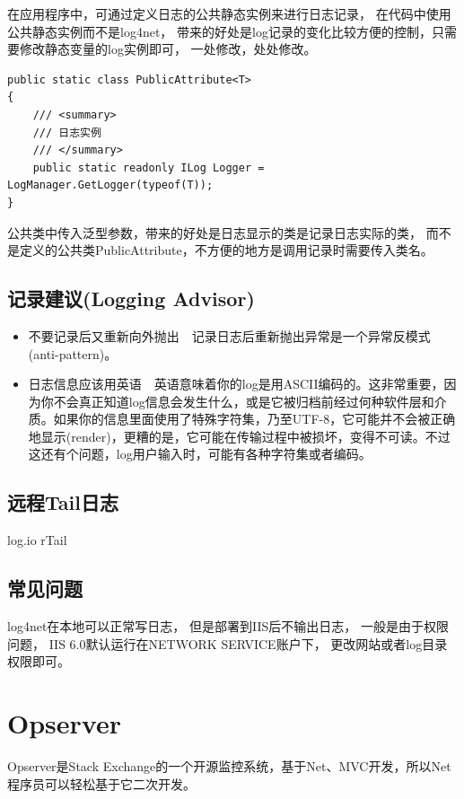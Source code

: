 \documentclass{book}
\begin{document}
在应用程序中，可通过定义日志的公共静态实例来进行日志记录，
在代码中使用公共静态实例而不是log4net，
带来的好处是log记录的变化比较方便的控制，只需要修改静态变量的log实例即可，
一处修改，处处修改。

\begin{lstlisting}[language={[Sharp]C}]
public static class PublicAttribute<T>
{
    /// <summary>
    /// 日志实例
    /// </summary>
    public static readonly ILog Logger = LogManager.GetLogger(typeof(T));
}
\end{lstlisting}

公共类中传入泛型参数，带来的好处是日志显示的类是记录日志实际的类，
而不是定义的公共类PublicAttribute，不方便的地方是调用记录时需要传入类名。

\subsection{记录建议(Logging Advisor)}

\begin{itemize}
	\item{不要记录后又重新向外抛出}~~记录日志后重新抛出异常是一个异常反模式(anti-pattern)。
	\item{日志信息应该用英语}~~英语意味着你的log是用ASCII编码的。这非常重要，因为你不会真正知道log信息会发生什么，或是它被归档前经过何种软件层和介质。如果你的信息里面使用了特殊字符集，乃至UTF-8，它可能并不会被正确地显示(render)，更糟的是，它可能在传输过程中被损坏，变得不可读。不过这还有个问题，log用户输入时，可能有各种字符集或者编码。
\end{itemize}

\subsection{远程Tail日志}

log.io rTail

\subsection{常见问题}

log4net在本地可以正常写日志，
但是部署到IIS后不输出日志，
一般是由于权限问题，
IIS 6.0默认运行在NETWORK SERVICE账户下，
更改网站或者log目录权限即可。

\section{Opserver}

Opserver是Stack Exchange的一个开源监控系统，基于Net、MVC开发，所以Net程序员可以轻松基于它二次开发。
\end{document}
